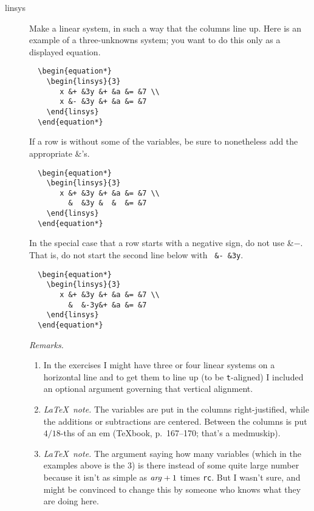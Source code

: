 \documentclass[titlepage]{article}
\newcommand{\latexnote}{\textit{\LaTeX\ note.} }
\begin{document}
\begin{description}
\item[linsys] 
  Make a linear system, in such a way that the columns line up.    
  Here is an example of a three-unknowns system; you want to
  do this only as a displayed equation.
\begin{verbatim}
  \begin{equation*}
    \begin{linsys}{3}
       x &+ &3y &+ &a &= &7 \\
       x &- &3y &+ &a &= &7 
    \end{linsys}
  \end{equation*}
\end{verbatim}
  If a row is without some of the variables, be sure to nonetheless
  add the appropriate \&'s.
\begin{verbatim}
  \begin{equation*}
    \begin{linsys}{3}
       x &+ &3y &+ &a &= &7 \\
         &  &3y &  &  &= &7 
    \end{linsys}
  \end{equation*}
\end{verbatim}
  In the special case that a row starts with a negative sign, do not 
  use \&$-$.
  That is, do not start the second line below with \verb! &- &3y!.
\begin{verbatim}
  \begin{equation*}
    \begin{linsys}{3}
       x &+ &3y &+ &a &= &7 \\
         &  &-3y&+ &a &= &7 
    \end{linsys}
  \end{equation*}
\end{verbatim}

  \textit{Remarks.}
  \begin{enumerate}
    \item 
      In the exercises I might have three or four linear systems on 
      a horizontal line and to get them to line up (to be \texttt{t}-aligned)
      I included an optional argument governing that vertical alignment.
    \item 
      \latexnote
      The variables are put in the columns right-justified, while the  
      additions or subtractions are centered.
      Between the columns is put $4/18$-ths of an em (\TeX book, p.~167--170;
      that's a medmuskip).
    \item
      \latexnote 
      The argument saying how many variables (which in the examples above
      is the $3$)
      is there instead of some quite large number because it isn't
      as simple as $\text{\textit{arg}}+1$ times \texttt{rc}.
      But I wasn't sure, and might be convinced to change this by someone
      who knows what they are doing here.
  \end{enumerate}


\end{description}
\end{document}

